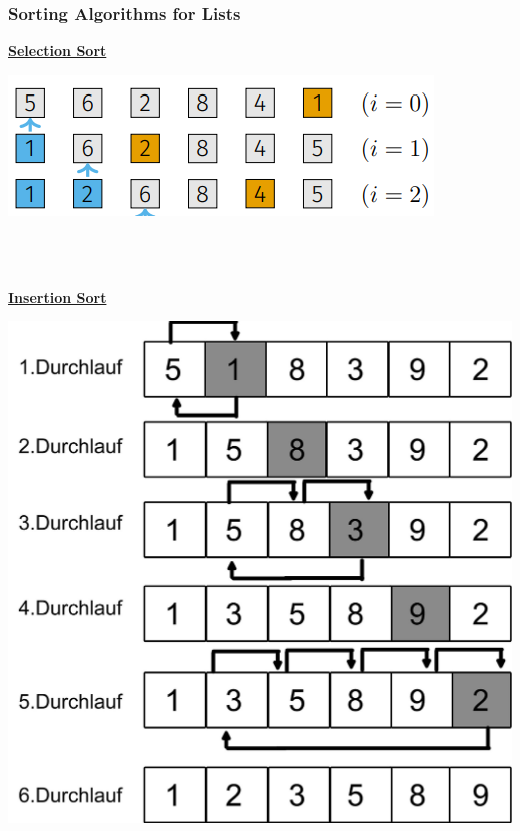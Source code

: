 \subsubsection{Sorting Algorithms for Lists} \label{section_sorting_list}
    {\centering\underline{\textbf{Selection Sort}} \par}
        \begin{minipage}{0.59\linewidth}
            \includegraphics[width = \linewidth]{src/3_containers/images/selection_sort.png}
        \end{minipage}
        \begin{minipage}{0.39\linewidth}
            \\
            \\
        \end{minipage}

        

    {\centering\underline{\textbf{Insertion Sort}} \par}
        \begin{minipage}{0.64\linewidth}
            
        \end{minipage}
        \begin{minipage}{0.34\linewidth}
            \includegraphics[width = \linewidth]{src/3_containers/images/insertion_sort.png}
        \end{minipage}

